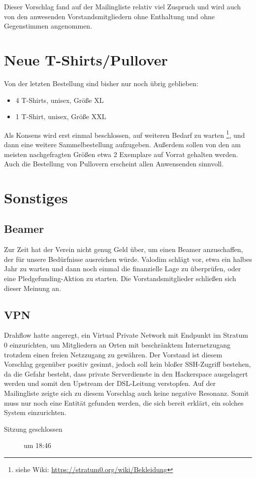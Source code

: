 \documentclass[a4paper,12pt]{scrartcl}
\begin{document}
Dieser Vorschlag fand auf der Mailingliste relativ viel Zuspruch und wird auch
von den anwesenden Vorstandsmitgliedern ohne Enthaltung und ohne Gegenstimmen
angenommen.

\section{Neue T-Shirts/Pullover}
Von der letzten Bestellung sind bisher nur noch übrig geblieben:
\begin{itemize}
	\item 4 T-Shirts, unisex, Größe XL
	\item 1 T-Shirt, unisex, Größe XXL
\end{itemize}

Als Konsens wird erst einmal beschlossen, auf weiteren Bedarf zu warten%
\footnote{siehe Wiki: \url{https://stratum0.org/wiki/Bekleidung}}, und dann
eine weitere Sammelbestellung aufzugeben. Außerdem sollen von den am meisten
nachgefragten Größen etwa 2 Exemplare auf Vorrat gehalten werden. Auch die
Bestellung von Pullovern erscheint allen Anwensenden sinnvoll.

\section{Sonstiges}
\subsection{Beamer}
Zur Zeit hat der Verein nicht genug Geld über, um einen Beamer anzuschaffen, der
für unsere Bedürfnisse ausreichen würde. Valodim schlägt vor, etwa ein halbes
Jahr zu warten und dann noch einmal die finanzielle Lage zu überprüfen, oder
eine Pledgefunding-Aktion zu starten. Die Vorstandsmitglieder schließen sich
dieser Meinung an.

\subsection{VPN}
Drahflow hatte angeregt, ein Virtual Private Network mit Endpunkt im
Stratum 0 einzurichten, um Mitgliedern an Orten mit beschränktem Internetzugang
trotzdem einen freien Netzzugang zu gewähren. Der Vorstand ist diesem Vorschlag
gegenüber positiv gesinnt, jedoch soll kein bloßer SSH-Zugriff bestehen, da
die Gefahr besteht, dass private Serverdienste in den Hackerspace ausgelagert
werden und somit den Upstream der DSL-Leitung verstopfen. Auf der Mailingliste
zeigte sich zu diesem Vorschlag auch keine negative Resonanz. Somit muss nur
noch eine Entität gefunden werden, die sich bereit erklärt, ein solches System
einzurichten.

\begin{description}
	\item[Sitzung geschlossen] um 18:46
\end{description}
\end{document}
